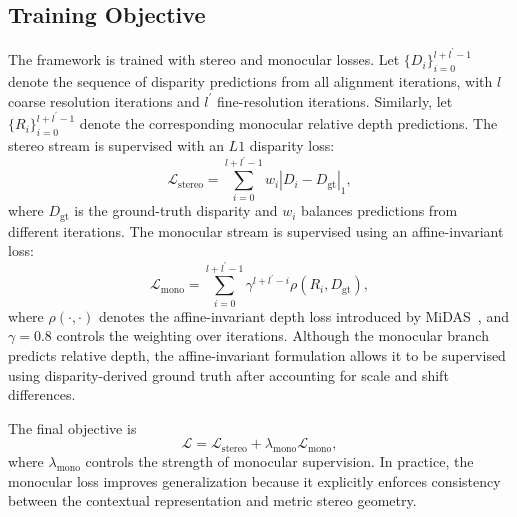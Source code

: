 \subsection{Training Objective}
The framework is trained with stereo and monocular losses.
Let $\{D_i\}_{i=0}^{l+l^{\prime}-1}$ denote the sequence of disparity predictions from all alignment iterations, with $l$ coarse resolution iterations and $l^{\prime}$ fine-resolution iterations.
Similarly, let $\{R_i\}_{i=0}^{l+l^{\prime}-1}$ denote the corresponding monocular relative depth predictions.
The stereo stream is supervised with an $L1$ disparity loss:
\begin{equation} \mathcal{L}_{\mathrm{stereo}} = \sum_{i=0}^{l+l^{\prime}-1} w_i \left|D_i - D_{\mathrm{gt}}\right|_1, \label{eq:bridge_stereo_loss} 
\end{equation}
where $D_{\mathrm{gt}}$ is the ground-truth disparity and $w_i$ balances predictions from different iterations.
The monocular stream is supervised using an affine-invariant loss:
\begin{equation} \mathcal{L}_{\mathrm{mono}} = \sum_{i=0}^{l+l^{\prime}-1} \gamma^{l+l^{\prime}-i} \rho\left(R_i, D_{\mathrm{gt}}\right), \label{eq:bridge_mono_loss} 
\end{equation}
where $\rho(\cdot,\cdot)$ denotes the affine-invariant depth loss introduced by MiDAS~\cite{ranftl2020towards}, and $\gamma=0.8$ controls the weighting over iterations.
Although the monocular branch predicts relative depth, the affine-invariant formulation allows it to be supervised using disparity-derived ground truth after accounting for scale and shift differences.

The final objective is
\begin{equation} 
\mathcal{L} = \mathcal{L}_{\mathrm{stereo}} + \lambda_{\mathrm{mono}}\mathcal{L}_{\mathrm{mono}}, 
\end{equation}
where $\lambda_{\mathrm{mono}}$ controls the strength of monocular supervision.
In practice, the monocular loss improves generalization because it explicitly enforces consistency between the contextual representation and metric stereo geometry.

